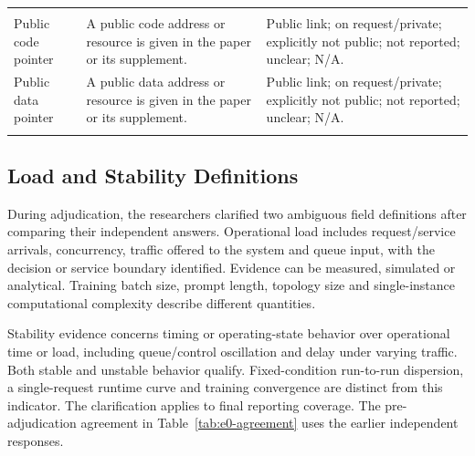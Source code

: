 \begin{longtable}{>{\raggedright\arraybackslash}p{.20\sokdefinitionwidth}>{\raggedright\arraybackslash}p{.47\sokdefinitionwidth}>{\raggedright\arraybackslash}p{.33\sokdefinitionwidth}}
\rowcolor{ebAmber!45}\multicolumn{3}{l}{\textbf{\itshape Artifact pointers}} \\*
Public code pointer & A public code address or resource is given in the paper or its supplement. & Public link; on request/private; explicitly not public; not reported; unclear; N/A. \\ \addlinespace[3pt]
Public data pointer & A public data address or resource is given in the paper or its supplement. & Public link; on request/private; explicitly not public; not reported; unclear; N/A. \\ \addlinespace[3pt]
\end{longtable}\endgroup
\subsection{Load and Stability Definitions}\label{app:e0-c1}
During adjudication, the researchers clarified two ambiguous field definitions after comparing their independent answers. Operational load includes request/service arrivals, concurrency, traffic offered to the system and queue input, with the decision or service boundary identified. Evidence can be measured, simulated or analytical. Training batch size, prompt length, topology size and single-instance computational complexity describe different quantities.

Stability evidence concerns timing or operating-state behavior over operational time or load, including queue/control oscillation and delay under varying traffic. Both stable and unstable behavior qualify. Fixed-condition run-to-run dispersion, a single-request runtime curve and training convergence are distinct from this indicator. The clarification applies to final reporting coverage. The pre-adjudication agreement in Table~\ref{tab:e0-agreement} uses the earlier independent responses.
